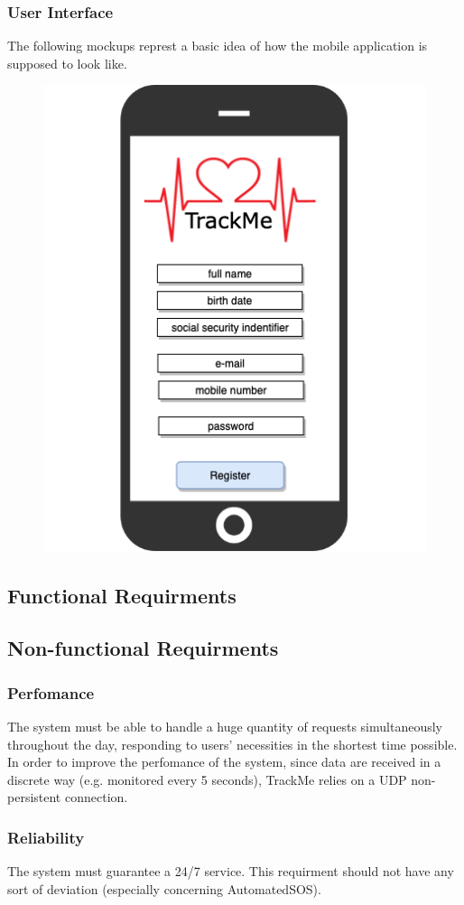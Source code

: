 \documentclass[12pt,a4paper]{article}
\begin{document}
	\subsubsection{User Interface}
	The following mockups represt a basic idea of how the mobile application is supposed to look like.\\
		\begin{figure}[h]
		\centering
		\includegraphics[width=0.7\linewidth]{Images/registration}
		\label{fig:registration}
	\end{figure}
	\subsection{Functional Requirments}
	\subsection{Non-functional Requirments}
	\subsubsection{Perfomance}
	The system must be able to handle a huge quantity of requests simultaneously throughout the day, responding to users' necessities in the shortest time possible. In order to improve the perfomance of the system, since data are received in a discrete way (e.g. monitored every 5 seconds), TrackMe relies on a UDP non-persistent connection.
	\subsubsection{Reliability}
	The system must guarantee a 24/7 service. This requirment should not have any sort of deviation (especially concerning AutomatedSOS).
\end{document}
